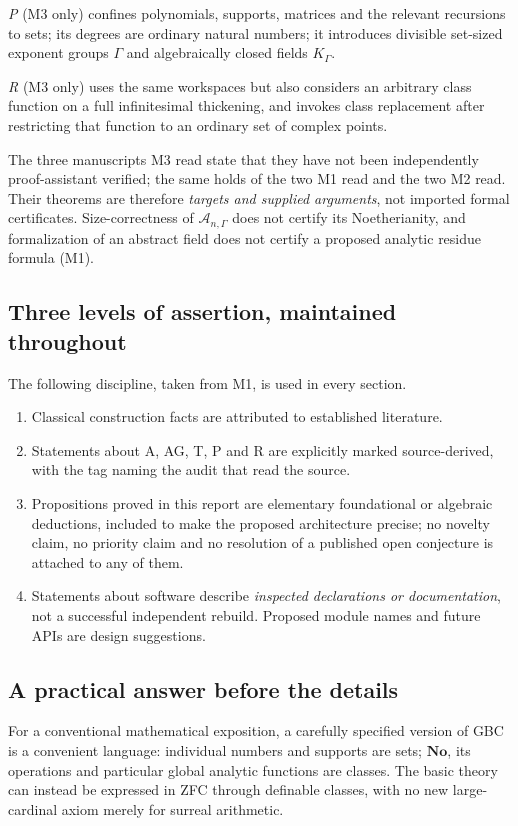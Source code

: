 \documentclass[11pt,letterpaper]{article}
\numberwithin{equation}{section}
\theoremstyle{definition}
\theoremstyle{remark}
\newcommand{\No}{\mathbf{No}}
\newcommand{\Ag}{\mathscr A}
\begin{document}
\emph{P} (M3 only) confines polynomials, supports, matrices and the relevant
recursions to sets; its degrees are ordinary natural numbers; it introduces
divisible set-sized exponent groups $\Gamma$ and algebraically closed fields
$K_\Gamma$.

\emph{R} (M3 only) uses the same workspaces but also considers an arbitrary
class function on a full infinitesimal thickening, and invokes class
replacement after restricting that function to an ordinary set of complex
points.

The three manuscripts M3 read state that they have not been independently
proof-assistant verified; the same holds of the two M1 read and the two M2
read. Their theorems are therefore \emph{targets and supplied arguments}, not
imported formal certificates. Size-correctness of $\Ag_{n,\Gamma}$ does not
certify its Noetherianity, and formalization of an abstract field does not
certify a proposed analytic residue formula (M1).

\subsection{Three levels of assertion, maintained throughout}
\label{found:sub:threelevels}
The following discipline, taken from M1, is used in every section.
\begin{enumerate}
\item Classical construction facts are attributed to established literature.
\item Statements about A, AG, T, P and R are explicitly marked source-derived,
with the tag naming the audit that read the source.
\item Propositions proved in this report are elementary foundational or
algebraic deductions, included to make the proposed architecture precise; no
novelty claim, no priority claim and no resolution of a published open
conjecture is attached to any of them.
\item Statements about software describe \emph{inspected declarations or
documentation}, not a successful independent rebuild. Proposed module names and
future APIs are design suggestions.
\end{enumerate}

\subsection{A practical answer before the details}
\label{found:sub:practical}
For a conventional mathematical exposition, a carefully specified version of
GBC is a convenient language: individual numbers and supports are sets; $\No$,
its operations and particular global analytic functions are classes. The basic
theory can instead be expressed in ZFC through definable classes, with no new
large-cardinal axiom merely for surreal arithmetic.
\end{document}
